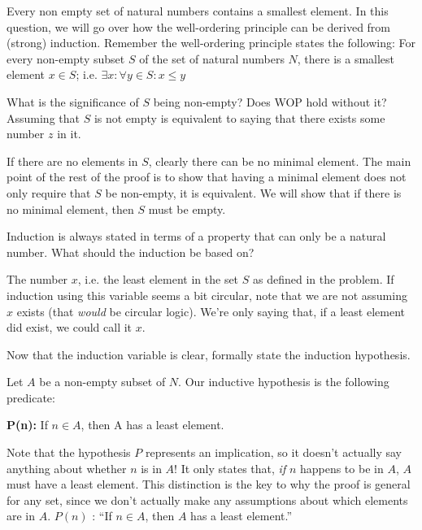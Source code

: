 \question Every non empty set of natural numbers contains a smallest 
element. \newline
In this question, we will go over how the well-ordering principle can 
be derived from (strong) induction. Remember the well-ordering principle 
states the following: For every non-empty subset $S$ of the set of natural 
numbers $N$, there is a smallest element $x \in S$; i.e. $\exists x : 
\forall y \in S : x \leq y $

\begin{questions}
\item What is the significance of $S$ being non-empty? Does WOP hold 
without it? Assuming that $S$ is not empty is equivalent to saying that 
there exists some number $z$ in it.
\begin{solution}[0.5 in]
If there are no elements in $S$, clearly there can be no minimal 
element. The main point of the rest of the proof is to show that 
having a minimal element does not only require that $S$ be non-empty, 
it is equivalent. We will show that if there is no minimal element, 
then $S$ must be empty.
\end{solution}

\item Induction is always stated in terms of a property that can only 
be a natural number. What should the induction be based on?
\begin{solution}[0.4 in]
The number $x$, i.e. the least element in the set $S$ as defined in 
the problem. If induction using this variable seems a bit circular, 
note that we are not assuming $x$ exists (that \emph{would} be 
circular logic). We're only saying that, if a least element did exist, 
we could call it $x$. 
\end{solution}

\item Now that the induction variable is clear, formally state the 
induction hypothesis.
\begin{solution}[0.5 in]
Let $A$ be a non-empty subset of $N$. Our inductive hypothesis is 
the following predicate: 

\textbf{P(n):} If $n \in A$, then A has a least element.

Note that the hypothesis $P$ represents an implication, so it doesn't 
actually say anything about whether $n$ is in $A$! It only states that, 
\emph{if} $n$ happens to be in $A$, $A$ must have a least element. This 
distinction is the key to why the proof is general for any set, since 
we don't actually make any assumptions about which elements are in $A$.
$P(n)$ : “If $n \in A$, then $A$ has a least element.”
\end{solution}


\end{questions}
